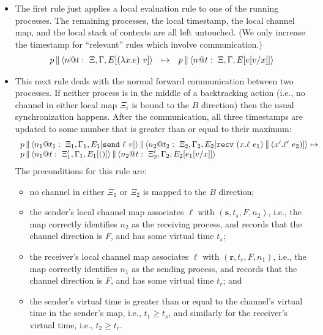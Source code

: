 \documentclass{article}
\begin{document}
\begin{itemize}
\item The first rule just applies a local evaluation rule to one of the
  running processes. The remaining processes, the local timestamp, the local
  channel map, and the local stack of contexts are all left untouched. (We
  only increase the timestamp for ``relevant'' rules which involve
  communication.)
\[\begin{array}{rcl}
  \parc{p}{\proc{n}{\Gamma}{\Xi}{E[(\lambda x.e)~v]}{t}} &\mapsto& 
  \parc{p}{\proc{n}{\Gamma}{\Xi}{E[e[v/x]]}{t}}
\end{array}\]

\item This next rule deals with the normal forward communication between two
  processes. If neither process is in the middle of a backtracking action
  (i.e., no channel in either local map $\Xi_i$ is bound to the $B$
  direction) then the usual synchronization happens. After the communication,
  all three timestamps are updated to some number that is greater than or
  equal to their maximum:
\[\begin{array}{l}
  \parc{p}
  {\parc{\proc{n_1}{\Gamma_1}{\Xi_1}{E_1[\send{\ell}{v}]}{t_1}}
        {\proc{n_2}{\Gamma_2}{\Xi_2}{E_2[\recv{x}{\ell}{x'}{\ell'}{e_1}{e_2}]}{t_2}}}
  \mapsto \\
  \parc{p}{\parc{\proc{n_1}{\Gamma_1}{\Xi_1'}{E_1[()]}{t}}
    {\proc{n_2}{\Gamma_2}{\Xi_2'}{E_2[e_1[v/x]]}{t}}}
\end{array}\]
The preconditions for this rule are: 
\begin{itemize}
\item no channel in either $\Xi_1$ or $\Xi_2$ is mapped to the $B$ direction;
\item the sender's local channel map associates $\ell$ with
  $(\textbf{s},t_s,F,n_2)$, i.e., the map correctly identifies $n_2$ as the
  receiving process, and records that the channel direction is $F$, and has
  some virtual time $t_s$;
\item the receiver's local channel map associates $\ell$ with
  $(\textbf{r},t_r,F,n_1)$, i.e., the map correctly identifies $n_1$ as the
  sending process, and records that the channel direction is $F$, and has
  some virtual time $t_r$; and
\item the sender's virtual time is greater than or equal to the channel's
  virtual time in the sender's map, i.e., $t_1 \geq t_s$, and similarly for
  the receiver's virtual time, i.e., $t_2 \geq t_r$.
\end{itemize}

\end{itemize}
\end{document}
